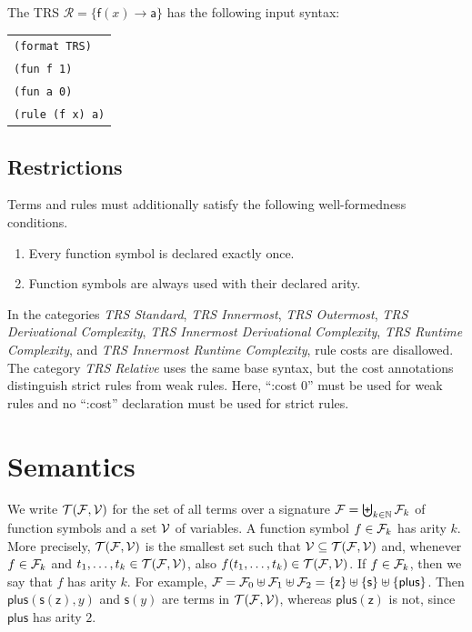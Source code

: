 \begin{example}
The TRS $\mathcal{R} = \{\mathsf{f}(x) \to \mathsf{a}\}$ has the following input syntax:
\begin{center}
\begin{tabular}{l}
\texttt{(format TRS)} \\
\texttt{(fun f 1)} \\
\texttt{(fun a 0)} \\
\texttt{(rule (f x) a)}
\end{tabular}
\end{center}
\end{example}

\subsection{Restrictions}

Terms and rules must additionally satisfy the following well-formedness conditions.

\begin{enumerate}
\item Every function symbol is declared exactly once.
\item Function symbols are always used with their declared arity.
\end{enumerate}

In the categories \emph{TRS Standard}, \emph{TRS Innermost}, \emph{TRS Outermost}, \emph{TRS Derivational Complexity}, 
\emph{TRS Innermost Derivational Complexity}, \emph{TRS Runtime Complexity}, and \emph{TRS Innermost Runtime Complexity}, rule costs are disallowed.
The category \emph{TRS Relative} uses the same base syntax, but the cost annotations distinguish strict rules from weak rules.
Here, ``:cost $0$'' must be used for weak rules and no ``:cost'' declaration must be used for strict rules.

\section{Semantics}\label{section:TRS-semantics}

We write $\mathcal{T}(\mathcal{F},\mathcal{V})$ for the set of all terms over a signature $\mathcal{F} = \biguplus_{k \in \mathbb{N}} \mathcal{F}_k$ of function symbols and a set $\mathcal{V}$ of variables.
A function symbol $f \in \mathcal{F}_k$ has arity $k$.
More precisely, $\mathcal{T}(\mathcal{F},\mathcal{V})$ is the smallest set such that $\mathcal{V} \subseteq \mathcal{T}(\mathcal{F},\mathcal{V})$ 
and, whenever $f \in \mathcal{F}_k$ and $t_1,\ldots,t_k \in \mathcal{T}(\mathcal{F},\mathcal{V})$, also $f(t_1,\ldots,t_k) \in \mathcal{T}(\mathcal{F},\mathcal{V})$.
If $f \in \mathcal{F}_k$, then we say that $f$ has arity $k$.
For example, $\mathcal{F} = \mathcal{F}_0 \uplus \mathcal{F}_1 \uplus \mathcal{F}_2 = \{\mathsf{z}\} \uplus \{\mathsf{s}\} \uplus \{\mathsf{plus}\}$.
Then $\mathsf{plus}(\mathsf{s}(\mathsf{z}),y)$ and $\mathsf{s}(y)$ are terms in $\mathcal{T}(\mathcal{F},\mathcal{V})$,
whereas $\mathsf{plus}(\mathsf{z})$ is not, since $\mathsf{plus}$ has arity $2$.

